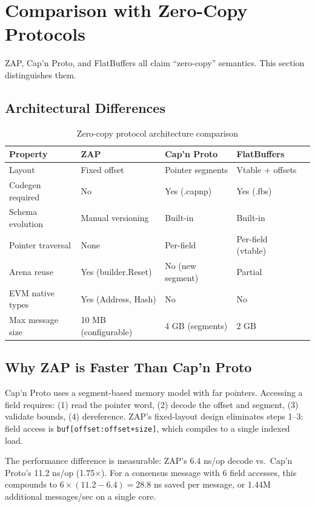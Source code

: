 \section{Comparison with Zero-Copy Protocols}


ZAP, Cap'n Proto, and FlatBuffers all claim ``zero-copy'' semantics. This section distinguishes them.

\subsection{Architectural Differences}

\begin{table}[h]
\centering
\caption{Zero-copy protocol architecture comparison}
\label{tab:zerocopy}
\begin{tabular}{lllll}
\toprule
\textbf{Property} & \textbf{ZAP} & \textbf{Cap'n Proto} & \textbf{FlatBuffers} \\
\midrule
Layout & Fixed offset & Pointer segments & Vtable + offsets \\
Codegen required & No & Yes (.capnp) & Yes (.fbs) \\
Schema evolution & Manual versioning & Built-in & Built-in \\
Pointer traversal & None & Per-field & Per-field (vtable) \\
Arena reuse & Yes (builder.Reset) & No (new segment) & Partial \\
EVM native types & Yes (Address, Hash) & No & No \\
Max message size & 10 MB (configurable) & 4 GB (segments) & 2 GB \\
\bottomrule
\end{tabular}
\end{table}

\subsection{Why ZAP is Faster Than Cap'n Proto}

Cap'n Proto uses a segment-based memory model with far pointers. Accessing a field requires: (1) read the pointer word, (2) decode the offset and segment, (3) validate bounds, (4) dereference. ZAP's fixed-layout design eliminates steps 1--3: field access is \texttt{buf[offset:offset+size]}, which compiles to a single indexed load.

The performance difference is measurable: ZAP's 6.4 ns/op decode vs.\ Cap'n Proto's 11.2 ns/op (1.75$\times$). For a consensus message with 6 field accesses, this compounds to $6 \times (11.2 - 6.4) = 28.8$ ns saved per message, or 1.44M additional messages/sec on a single core.

